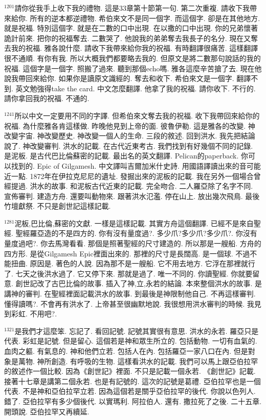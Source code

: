 \documentclass{book}
\begin{document}
$^{1201}$請你從我手上收下我的禮物.
這是33章第十節第一句.
第二次重複.
請收下我帶來給你.
所有的逆本都逆禮物.
希伯來文不是同一個字.
而這個字.
卻是在其他地方.
就是祝福.
特別這個字.
就是在二數的口中出現.
在以撒的口中出現.
你的兄弟懷著詭計前來.
把你的祝福奪去.
二數哭了.
他說我的弟弟奪去我長子的名分.
現在又奪去我的祝福.
雅各說什麼.
請收下我帶來給你我的祝福.
有時翻譯很痛苦.
這樣翻譯很不通順.
有你有我.
所以大概我們都要略去我的.
但原文是將二數那句說話的我的祝福.
這個字是一個字.
照搬了過來.
聽到那個echo嗎.
雅各這麼辛苦搶了去.
現在他說我帶回來給你.
如果你是讀原文識經的.
奪去和收下.
希伯來文是一個字.
翻譯不到.
英文勉強得take the card.
中文怎麼翻譯.
他拿了我的祝福.
請你收下.
不行的.
請你拿回我的祝福.
不通的.

$^{1241}$所以中文一定要用不同的字譯.
但希伯來文奪去我的祝福.
收下我帶回來給你的祝福.
為什麼雅各肯這樣做.
昨晚他見到上帝的面.
彼魯伊勒.
這是雅各的改變.
神改變宇宙.
神改變歷史.
神改變一個人的生命.
三段的敘述.
回到洪水.
我先把結論說了.
神改變審判.
洪水的記載.
在古代近東考古.
我們找到有好幾個不同的記錄.
是泥板.
是古代巴比倫蘇密的記載.
最出名的英文翻譯.
Pelican的paperback.
你可以找到的.
Epic of Gilgamesh.
中文譯叫吉爾加米什史詩.
用國語譯讀出來的音可能近一點.
1872年在伊拉克尼尼的遺址.
發掘出來的泥板的記載.
我在另外一個場合曾經提過.
洪水的故事.
和泥板古代近東的記載.
完全吻合.
二人羅亞除了名字不同.
宣佈審判.
建造方舟.
還要叫動物來.
跟著洪水氾濫.
停在山上.
放出幾次飛鳥.
最後竹壇獻祭.
不只是創世記這樣記載.

$^{1281}$泥板,巴比倫,蘇密的文獻.
一樣是這樣記載.
其實方舟這個翻譯.
已經不是來自聖經.
聖經羅亞造的不是四方的.
你有沒有量度過?.
多少爪?多少爪?多少爪?.
你沒有量度過吧?.
你去馬灣看看.
那個是照著聖經的尺寸建造的.
所以那是一艘船.
方舟的四方形.
是從Gilgamesh Epic裡面出來的.
那裡的尺寸是長闊高.
是一個球.
不過不能扭曲.
原因是.
著色的人說.
因為那不是一艘船.
它不用去地方.
它浮在那裡就行了.
七天之後洪水過了.
它又停下來.
那就是過了.
唯一不同的.
你讀聖經.
你就要留意.
創世記改了古巴比倫的故事.
插入了神,立,永若的結論.
本來整個洪水的故事.
是講神的審判.
在聖經裡面記載洪水的故事.
到最後是神限制他自己.
不再這樣審判.
懂得讀嗎?.
不會再有洪水了.
上帝甚至很幽默地說.
我很想用洪水審判的時候.
我見到彩虹.
不用吧?.

$^{1321}$是我們才這麼笨.
忘記了.
看回記號.
記號其實很有意思.
洪水的永若.
羅亞只是代表.
彩虹是記號.
但是留心.
這個若是神和眾生所立的.
包括動物.
一切有血氣的.
血肉之軀.
有氣息的.
神和他們立若.
包括人在內.
包括羅亞一家八口在內.
但是對象是萬物.
神所創造.
有呼吸的生物.
這樣看洪水的記載.
我們可以馬上跟亞伯拉罕的敘述作一個比較.
因為《創世記》裡面.
不只是記載一個永若.
《創世記》記載.
接著十七章是講第二個永若.
也是有記號的.
這次的記號是葛禮.
亞伯拉罕也是一個代表.
不是神和亞伯拉罕立若.
因為這個若是關乎亞伯拉罕的後代.
你說以色列人.
錯了.
亞伯拉罕有多少個後代.
以實瑪利.
阿拉伯人.
還有.
撒拉死了之後.
二十五章.
開頭說.
亞伯拉罕又再續延.
\end{document}
